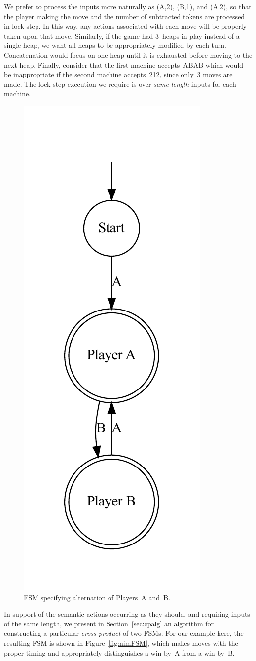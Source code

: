 \documentclass[sigplan,anonymous,review]{acmart}
\begin{document}
We prefer to process the inputs more naturally as (A,2), (B,1), and (A,2), so that the player making the move and the number of subtracted tokens are processed in lock-step.  In this way, any actions associated with each move will be properly taken upon that move.  Similarly, if the game had 3~heaps in play instead of a single heap, we want all heaps to be appropriately modified by each turn.  Concatenation would focus on one heap until it is exhausted before moving to the next heap.   Finally, consider that the first machine accepts~ABAB which would be inappropriate if the second machine accepts~212, since only~3 moves are made.  The lock-step execution we require is over \emph{same-length} inputs for each machine.

\begin{figure}
    \centering
    \includegraphics[width=0.35\linewidth]{figures/nimexample/playerFSM.pdf}
    \caption{FSM specifying alternation of Players~A and~B.}
    \label{fig:nimPlayerFSM}
\end{figure}

In support of the semantic actions occurring as they should, and requiring inputs of the same length, we present in Section~\ref{sec:cpalg} an algorithm for constructing a particular \emph{cross product} of two FSMs.  For our example here, the resulting FSM is shown in Figure~\ref{fig:nimFSM}, which makes moves with the proper timing and appropriately distinguishes a win by~A from a win by~B.
\end{document}
